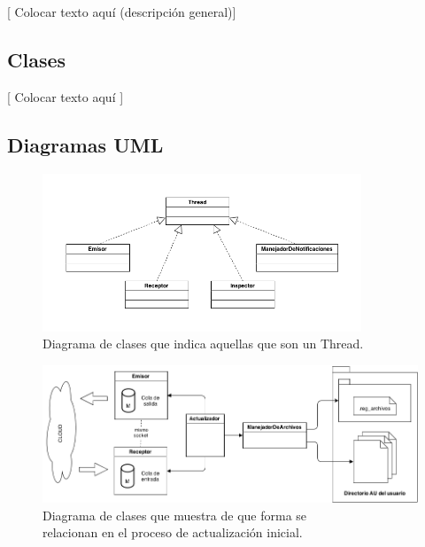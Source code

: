 \documentclass{article}
\begin{document}
	[ Colocar texto aquí (descripción general)]
\bigskip



\subsection{Clases}

	[ Colocar texto aquí ]
\bigskip



\subsection{Diagramas UML}


\begin{figure}[h]
	\centering
	\includegraphics[width=0.85\textwidth]{images/Diagrama-modelo-cliente-threads.png}
	\caption{Diagrama de clases que indica aquellas que son un Thread.}
\end{figure}
\bigskip


\begin{figure}[h]
	\centering
	\includegraphics[width=1.0\textwidth]{images/Diagrama-modelo-cliente-actualizacion.png}
	\medskip
	\caption{Diagrama de clases que muestra de que forma se \\ relacionan en el proceso de actualización inicial.}
\end{figure}
\bigskip
\end{document}
